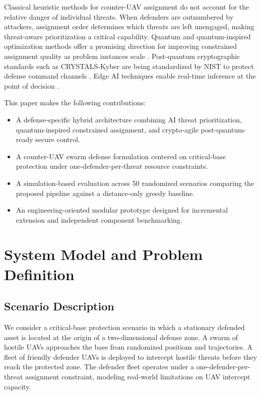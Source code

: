 \documentclass[12pt, a4paper]{article}
\begin{document}
Classical heuristic methods for counter-UAV assignment do not account for the relative danger of individual threats. When defenders are outnumbered by attackers, assignment order determines which threats are left unengaged, making threat-aware prioritization a critical capability. Quantum and quantum-inspired optimization methods offer a promising direction for improving constrained assignment quality as problem instances scale \cite{farhi2014quantum, kadowaki1998quantum, lucas2014ising, glover2019quantum}. Post-quantum cryptographic standards such as CRYSTALS-Kyber are being standardized by NIST to protect defense command channels \cite{avanzi2019crystals, chen2016report}. Edge AI techniques enable real-time inference at the point of decision \cite{shi2016edge, li2018learning}.

This paper makes the following contributions:
\begin{itemize}
  \item A defense-specific hybrid architecture combining AI threat prioritization, quantum-inspired constrained assignment, and crypto-agile post-quantum-ready secure control.
  \item A counter-UAV swarm defense formulation centered on critical-base protection under one-defender-per-threat resource constraints.
  \item A simulation-based evaluation across 50 randomized scenarios comparing the proposed pipeline against a distance-only greedy baseline.
  \item An engineering-oriented modular prototype designed for incremental extension and independent component benchmarking.
\end{itemize}

\section{System Model and Problem Definition}

\subsection{Scenario Description}

We consider a critical-base protection scenario in which a stationary defended asset is located at the origin of a two-dimensional defense zone. A swarm of hostile UAVs approaches the base from randomized positions and trajectories. A fleet of friendly defender UAVs is deployed to intercept hostile threats before they reach the protected zone. The defender fleet operates under a one-defender-per-threat assignment constraint, modeling real-world limitations on UAV intercept capacity.
\end{document}
